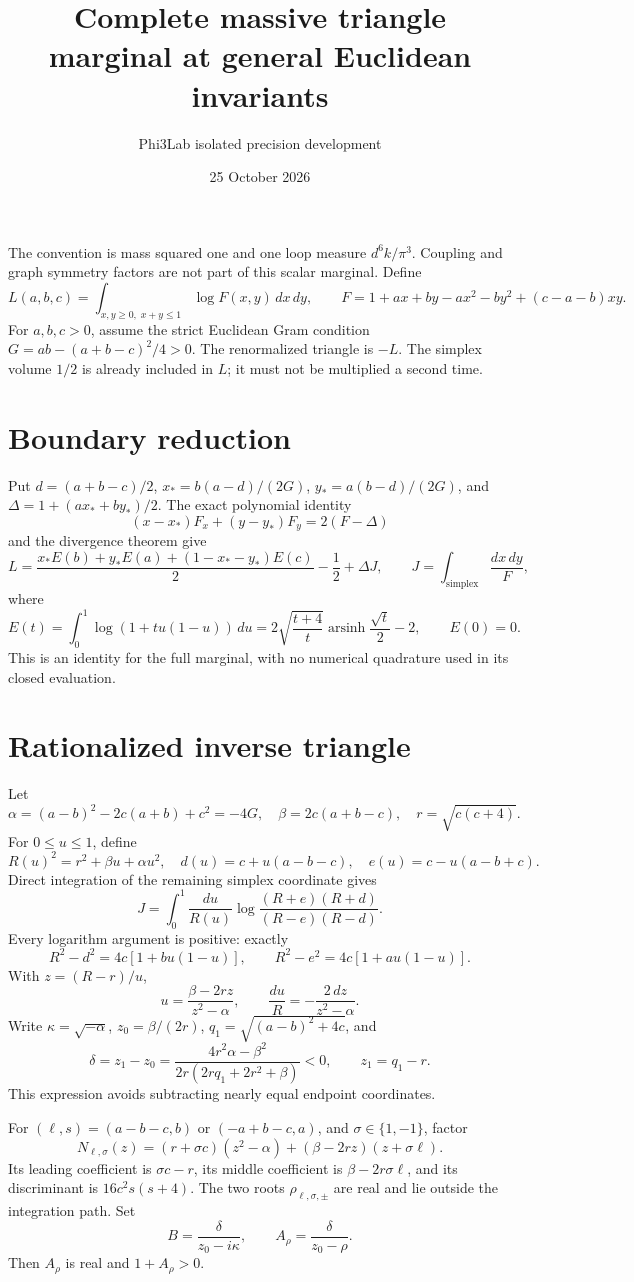 \documentclass[11pt]{article}
\title{Complete massive triangle marginal at general Euclidean invariants}
\author{Phi3Lab isolated precision development}
\date{25 October 2026}
\begin{document}
\maketitle
The convention is mass squared one and one loop measure \(d^6k/\pi^3\).
Coupling and graph symmetry factors are not part of this scalar marginal.
Define
\[
 L(a,b,c)=\int_{x,y\geq0,\;x+y\leq1}\log F(x,y)\,dx\,dy,\qquad
 F=1+ax+by-ax^2-by^2+(c-a-b)xy .
\]
For \(a,b,c>0\), assume the strict Euclidean Gram condition
\(G=ab-(a+b-c)^2/4>0\).
The renormalized triangle is \(-L\). The simplex volume \(1/2\) is
already included in \(L\); it must not be multiplied a second time.

\section*{Boundary reduction}
Put \(d=(a+b-c)/2\), \(x_*=b(a-d)/(2G)\),
\(y_*=a(b-d)/(2G)\), and
\(\Delta=1+(ax_*+by_*)/2\).
The exact polynomial identity
\[
 (x-x_*)F_x+(y-y_*)F_y=2(F-\Delta)
\]
and the divergence theorem give
\[
 L=\frac{x_*E(b)+y_*E(a)+(1-x_*-y_*)E(c)}{2}
      -\frac12+\Delta J,\qquad
 J=\int_{\text{simplex}}\frac{dx\,dy}{F},
\]
where
\[
 E(t)=\int_0^1\log(1+t u(1-u))\,du
 =2\sqrt{\frac{t+4}{t}}\operatorname{arsinh}\frac{\sqrt t}{2}-2,
 \qquad E(0)=0.
\]
This is an identity for the full marginal, with no numerical quadrature
used in its closed evaluation.

\section*{Rationalized inverse triangle}
Let
\[
 \alpha=(a-b)^2-2c(a+b)+c^2=-4G,\quad
 \beta=2c(a+b-c),\quad r=\sqrt{c(c+4)}.
\]
For \(0\leq u\leq1\), define
\[
 R(u)^2=r^2+\beta u+\alpha u^2,\quad
 d(u)=c+u(a-b-c),\quad e(u)=c-u(a-b+c).
\]
Direct integration of the remaining simplex coordinate gives
\[
 J=\int_0^1\frac{du}{R(u)}
 \log\frac{(R+e)(R+d)}{(R-e)(R-d)} .
\]
Every logarithm argument is positive: exactly
\[
 R^2-d^2=4c[1+bu(1-u)],\qquad
 R^2-e^2=4c[1+au(1-u)] .
\]
With \(z=(R-r)/u\),
\[
 u=\frac{\beta-2rz}{z^2-\alpha},\qquad
 \frac{du}{R}=-\frac{2\,dz}{z^2-\alpha}.
\]
Write \(\kappa=\sqrt{-\alpha}\), \(z_0=\beta/(2r)\),
\(q_1=\sqrt{(a-b)^2+4c}\), and
\[
 \delta=z_1-z_0
 =\frac{4r^2\alpha-\beta^2}
        {2r(2r q_1+2r^2+\beta)}<0,\qquad z_1=q_1-r .
\]
This expression avoids subtracting nearly equal endpoint coordinates.

For \((\ell,s)=(a-b-c,b)\) or \((-a+b-c,a)\), and
\(\sigma\in\{1,-1\}\), factor
\[
 N_{\ell,\sigma}(z)
 =(r+\sigma c)(z^2-\alpha)+(\beta-2rz)(z+\sigma\ell).
\]
Its leading coefficient is \(\sigma c-r\), its middle coefficient
is \(\beta-2r\sigma\ell\), and its discriminant is
\(16c^2s(s+4)\).
The two roots \(\rho_{\ell,\sigma,\pm}\) are real and lie outside the
integration path. Set
\[
 B=\frac{\delta}{z_0-i\kappa},\qquad
 A_\rho=\frac{\delta}{z_0-\rho}.
\]
Then \(A_\rho\) is real and \(1+A_\rho>0\).
\end{document}
